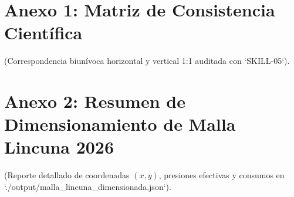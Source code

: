\documentclass[12pt,a4paper,oneside]{book}
\begin{document}
\chapter*{Anexo 1: Matriz de Consistencia Científica}
(Correspondencia biunívoca horizontal y vertical 1:1 auditada con `SKILL-05`).

\chapter*{Anexo 2: Resumen de Dimensionamiento de Malla Lincuna 2026}
(Reporte detallado de coordenadas $(x,y)$, presiones efectivas y consumos en `./output/malla_lincuna_dimensionada.json`).
\end{document}
